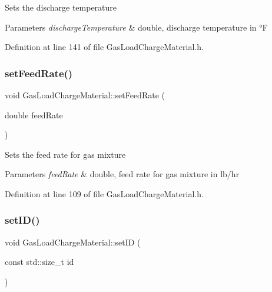 Sets the discharge temperature 
\begin{DoxyParams}{Parameters}
{\em discharge\+Temperature} & double, discharge temperature in °F \\
\hline
\end{DoxyParams}


Definition at line 141 of file Gas\+Load\+Charge\+Material.\+h.

\mbox{\label{class_gas_load_charge_material_a922b728dfd109d1c1684d7dfad82ec8e}} 
\subsubsection{\texorpdfstring{set\+Feed\+Rate()}{setFeedRate()}}
{\footnotesize\ttfamily void Gas\+Load\+Charge\+Material\+::set\+Feed\+Rate (\begin{DoxyParamCaption}\item[{double}]{feed\+Rate }\end{DoxyParamCaption})\hspace{0.3cm}{\ttfamily [inline]}}

Sets the feed rate for gas mixture 
\begin{DoxyParams}{Parameters}
{\em feed\+Rate} & double, feed rate for gas mixture in lb/hr \\
\hline
\end{DoxyParams}


Definition at line 109 of file Gas\+Load\+Charge\+Material.\+h.

\mbox{\label{class_gas_load_charge_material_a24b43ba7c871453258f458a8c1f15232}} 
\subsubsection{\texorpdfstring{set\+I\+D()}{setID()}}
{\footnotesize\ttfamily void Gas\+Load\+Charge\+Material\+::set\+ID (\begin{DoxyParamCaption}\item[{const std\+::size\+\_\+t}]{id }\end{DoxyParamCaption})\hspace{0.3cm}{\ttfamily [inline]}}


